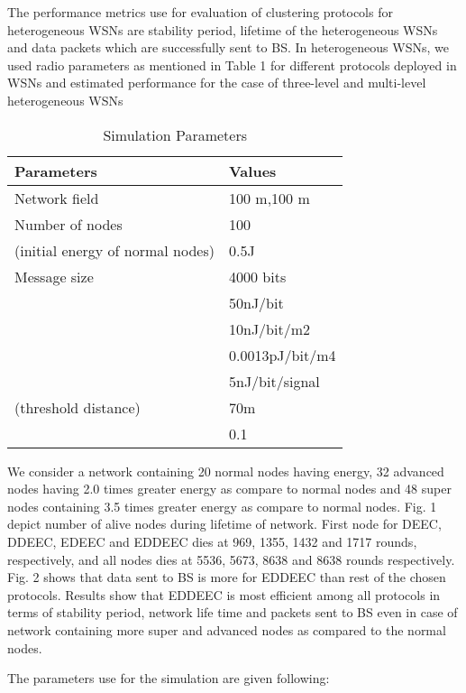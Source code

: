 \documentclass[3p,times,procedia]{elsarticle}
\begin{document}
The performance metrics use for evaluation of clustering protocols for heterogeneous WSNs are stability period, lifetime of the heterogeneous WSNs and data packets which are successfully sent to BS. In heterogeneous WSNs, we used radio parameters as mentioned in Table 1 for different protocols deployed in WSNs and estimated performance for the case of three-level and multi-level heterogeneous WSNs


\begin{table}[!h]
\caption{Simulation Parameters}
\begin{center}
    \begin{tabular}{ | p{2.5cm} | p{2.5cm} |}
    \hline
    Parameters &	Values\\ \hline
    Network field & 100 m,100 m\\ \hline
    Number of nodes	& 100\\ \hline
    (initial energy of normal nodes) & 0.5J\\ \hline
    Message size &	4000 bits \\ \hline
     & 50nJ/bit\\ \hline
     & 10nJ/bit/m2\\ \hline
     & 0.0013pJ/bit/m4\\ \hline
     & 5nJ/bit/signal\\ \hline
    (threshold distance) & 70m\\ \hline
     & 0.1 \\ \hline
\end{tabular}
\end{center}
\end{table}

We consider a network containing 20 normal nodes having  energy, 32 advanced nodes having 2.0 times greater energy as compare to normal nodes and 48 super nodes containing 3.5 times greater energy as compare to normal nodes. Fig. 1 depict number of alive nodes during lifetime of network. First node for DEEC, DDEEC, EDEEC and EDDEEC dies at 969, 1355, 1432 and 1717 rounds, respectively, and all nodes dies at 5536, 5673, 8638 and 8638 rounds respectively. Fig. 2 shows that data sent to BS is more for EDDEEC than rest of the chosen protocols. Results show that EDDEEC is most efficient among all protocols in terms of stability period, network life time and packets sent to BS even in case of network containing more super and advanced nodes as compared to the normal nodes.

The parameters use for the simulation are given following:
\end{document}
